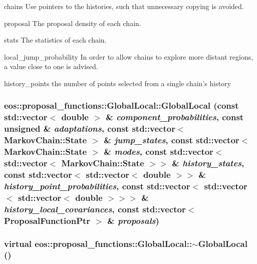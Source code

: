 \begin{DoxyParagraph}{chains Use pointers to the histories, such that unnecessary copying is avoided.}

\end{DoxyParagraph}
\begin{DoxyParagraph}{proposal The proposal density of each chain.}

\end{DoxyParagraph}
\begin{DoxyParagraph}{stats The statistics of each chain.}

\end{DoxyParagraph}
\begin{DoxyParagraph}{local\_\-jump\_\-probability In order to allow chains to explore more distant regions,}
a value close to one is advised. 
\end{DoxyParagraph}
\begin{DoxyParagraph}{history\_\-points the number of points selected from a single chain's history}

\end{DoxyParagraph}
\hypertarget{classeos_1_1proposal__functions_1_1GlobalLocal_aee4ba010b2c73b484c28eaaf7d42057c}{
\subsubsection[{GlobalLocal}]{\setlength{\rightskip}{0pt plus 5cm}eos::proposal\_\-functions::GlobalLocal::GlobalLocal (const std::vector$<$ double $>$ \& {\em component\_\-probabilities}, \/  const unsigned \& {\em adaptations}, \/  const std::vector$<$ {\bf MarkovChain::State} $>$ \& {\em jump\_\-states}, \/  const std::vector$<$ {\bf MarkovChain::State} $>$ \& {\em modes}, \/  const std::vector$<$ std::vector$<$ {\bf MarkovChain::State} $>$$>$ \& {\em history\_\-states}, \/  const std::vector$<$ std::vector$<$ double $>$$>$ \& {\em history\_\-point\_\-probabilities}, \/  const std::vector$<$ std::vector$<$ std::vector$<$ double $>$$>$$>$ \& {\em history\_\-local\_\-covariances}, \/  const std::vector$<$ {\bf ProposalFunctionPtr} $>$ \& {\em proposals})}}
\label{classeos_1_1proposal__functions_1_1GlobalLocal_aee4ba010b2c73b484c28eaaf7d42057c}
\hypertarget{classeos_1_1proposal__functions_1_1GlobalLocal_a31e2faf68a29cfc348905a8022a397e5}{
\subsubsection[{$\sim$GlobalLocal}]{\setlength{\rightskip}{0pt plus 5cm}virtual eos::proposal\_\-functions::GlobalLocal::$\sim$GlobalLocal ()}}
\label{classeos_1_1proposal__functions_1_1GlobalLocal_a31e2faf68a29cfc348905a8022a397e5}


